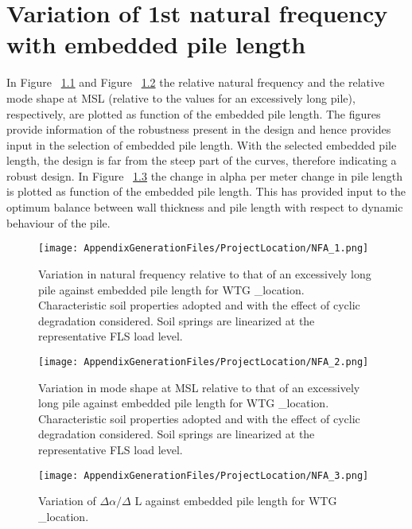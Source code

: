 \chapter{Variation of 1st natural frequency with embedded pile length}\label{sec_4}

In Figure ~\ref{alpha_variation} and Figure ~\ref{mode_shape_variation} the relative natural frequency and the relative mode shape at MSL (relative to the values for an excessively long pile), respectively, are plotted as function of the embedded pile length. The figures provide information of the robustness present in the design and hence provides input in the selection of embedded pile length. With the selected embedded pile length, the design is far from the steep part of the curves, therefore indicating a robust design.
In Figure ~\ref{delta_alpha} the change in alpha per meter change in pile length is plotted as function of the embedded pile length. This has provided input to the optimum balance between wall thickness and pile length with respect to dynamic behaviour of the pile.

\begin{figure}[!htbp]
\texttt{[image: AppendixGenerationFiles/ProjectLocation/NFA\_1.png]}
\caption{Variation in natural frequency relative to that of an excessively long pile against embedded pile length for WTG {\ID_location}. Characteristic soil properties adopted and with the effect of cyclic degradation considered. Soil springs are linearized at the representative FLS load level.}
\label{alpha_variation}\end{figure}

\begin{figure}[!htbp]
\texttt{[image: AppendixGenerationFiles/ProjectLocation/NFA\_2.png]}
\caption{Variation in mode shape at MSL relative to that of an excessively long pile against embedded pile length for WTG {\ID_location}. Characteristic soil properties adopted and with the effect of cyclic degradation considered. Soil springs are linearized at the representative FLS load level.}
\label{mode_shape_variation}\end{figure}

\begin{figure}[!htbp]
\texttt{[image: AppendixGenerationFiles/ProjectLocation/NFA\_3.png]}
\caption{Variation of $\Delta \alpha/\Delta$ L against embedded pile length for WTG {\ID_location}.}
\label{delta_alpha}\end{figure}
